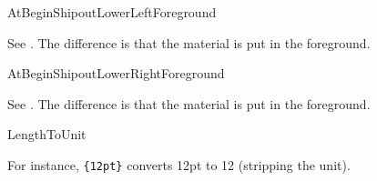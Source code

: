 \documentclass{ltxdoc}
\begin{document}
  \begin{declcs}{AtBeginShipoutLowerLeftForeground} 
 \end{declcs}
 See . The difference is that the material
 is put in the foreground.
 
  \begin{declcs}{AtBeginShipoutLowerRightForeground} 
 \end{declcs}
 See . The difference is that the material
 is put in the foreground.
 
  \begin{declcs}{LengthToUnit} 
 \end{declcs}
 For instance, \texttt{\{12pt\}} converts 12pt to 12 (stripping the unit).
\end{document}
